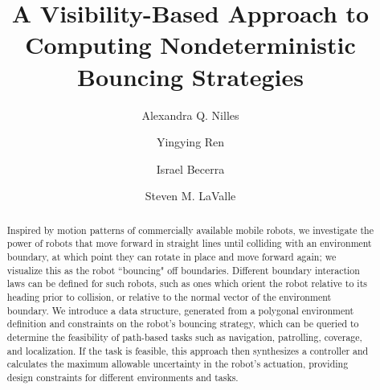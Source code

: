 \documentclass[]{svproc}  %
\begin{document}
\mainmatter              %


\title{A Visibility-Based Approach to Computing Nondeterministic Bouncing
Strategies}

\author{Alexandra Q. Nilles \and Yingying Ren \and Israel
Becerra \and Steven M. LaValle%
}


\maketitle

\begin{abstract}
Inspired by motion patterns of commercially available mobile robots, we investigate the power of robots that 
move forward in straight lines
until colliding with an environment boundary, at which point they can rotate in
place and move forward again; we visualize this as the robot ``bouncing" off
boundaries. Different boundary interaction laws can be
defined for such robots, such as ones which orient the robot relative to its
heading prior to collision, or relative to the normal vector of the environment
boundary. We introduce a data structure, generated from a polygonal environment
 definition and constraints on the robot's bouncing strategy, which can be
queried to determine the feasibility of path-based tasks such as navigation,
patrolling, coverage, and localization. If the task is feasible, this
approach then synthesizes a controller and calculates the maximum allowable 
uncertainty in the robot's actuation, providing design constraints for different 
environments and tasks.
\end{abstract}
\end{document}
